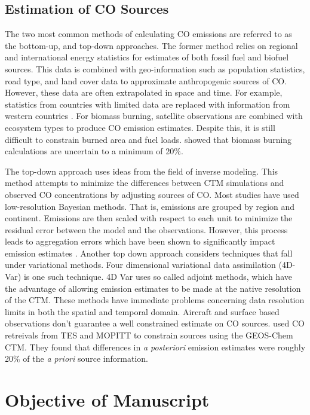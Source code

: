 \subsection{Estimation of CO Sources}
\label{sec:estimating co}
%

The two most common methods of calculating CO emissions are referred to as the bottom-up, and top-down approaches. The former method relies on regional and international energy statistics for estimates of both fossil fuel and biofuel sources. This data is combined with  geo-information such as population statistics, road type, and land cover data to approximate anthropogenic sources of CO. However, these data are often extrapolated in space and time. For example, statistics from countries with limited data are replaced with information from western countries \cite{streets2003}. For biomass burning, satellite observations are combined with ecosystem types to produce CO emission estimates. Despite this, it is still difficult to constrain burned area and fuel loads. \cite{van2010} showed that biomass burning calculations are uncertain to a minimum of 20$\%$.

The top-down approach uses ideas from the field of inverse modeling. This method attempts to minimize the differences between CTM simulations and observed CO concentrations by adjusting sources of CO. Most studies have used low-resolution Bayesian methods. That is, emissions are grouped by region and continent. Emissions are then scaled with respect to each unit to minimize the residual error between the model and the observations. However, this process leads to aggregation errors which have been shown to significantly impact emission estimates \cite{jiang2011}. Another top down approach considers techniques that fall under variational methods. Four dimensional variational data assimilation (4D-Var) is one such technique. 4D Var uses so called adjoint methods, which have the advantage of allowing emission estimates to be made at the native resolution of the CTM. These methods have immediate problems concerning data resolution limits in both the spatial and temporal domain. Aircraft and surface based observations don't guarantee a well constrained estimate on CO sources. \cite{jones2009} used CO retreivals from TES and MOPITT to constrain sources using the GEOS-Chem CTM. They found that differences in \textit{a posteriori} emission estimates were roughly 20$\%$ of the \textit{a priori} source information.

\section{Objective of Manuscript}
\label{sec:scope}

